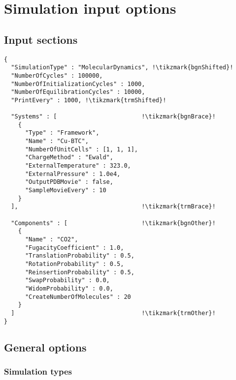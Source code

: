 \chapter{Simulation input options}

\section{Input sections}

\newpage
\begin{lstlisting}[name=listing,escapechar=!, caption={Structure and input sections of the \texttt{simulation.json} file.},captionpos=b]
{
  "SimulationType" : "MolecularDynamics", !\tikzmark{bgnShifted}!
  "NumberOfCycles" : 100000,
  "NumberOfInitializationCycles" : 1000,
  "NumberOfEquilibrationCycles" : 10000,
  "PrintEvery" : 1000, !\tikzmark{trmShifted}!

  "Systems" : [                        !\tikzmark{bgnBrace}!
    {
      "Type" : "Framework",
      "Name" : "Cu-BTC",
      "NumberOfUnitCells" : [1, 1, 1],
      "ChargeMethod" : "Ewald",
      "ExternalTemperature" : 323.0,
      "ExternalPressure" : 1.0e4,
      "OutputPDBMovie" : false,
      "SampleMovieEvery" : 10
    }
  ],                                   !\tikzmark{trmBrace}!

  "Components" : [                     !\tikzmark{bgnOther}!
    {
      "Name" : "CO2",
      "FugacityCoefficient" : 1.0,
      "TranslationProbability" : 0.5,
      "RotationProbability" : 0.5,
      "ReinsertionProbability" : 0.5,
      "SwapProbability" : 0.0,
      "WidomProbability" : 0.0,
      "CreateNumberOfMolecules" : 20
    }
  ]                                    !\tikzmark{trmOther}!
}
\end{lstlisting}


\section{General options}

\subsection{Simulation types}

